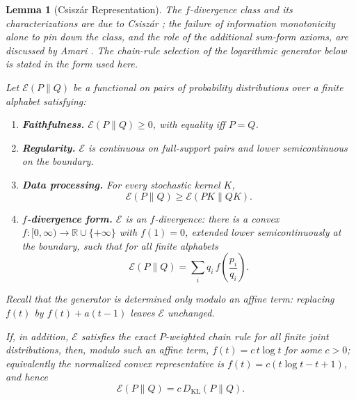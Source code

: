 \documentclass[12pt]{article}
\newtheorem{lemma}[theorem]{Lemma}
\theoremstyle{definition}
\begin{document}
\begin{lemma}[Csisz\'ar Representation]
\label{lem:csiszar-representation}
The $f$-divergence class and its characterizations are due to Csisz\'ar
\cite{csiszar1978}; the failure of information monotonicity alone to pin down
the class, and the role of the additional sum-form axioms, are discussed by
Amari \cite{amari2009}.  The chain-rule selection of the logarithmic generator
below is stated in the form used here.

Let $\mathcal E(P\|Q)$ be a functional on pairs of probability distributions
over a finite alphabet satisfying:
\begin{enumerate}[label=(\alph*)]
\item \textbf{Faithfulness.}
$\mathcal E(P\|Q)\ge0$, with equality iff $P=Q$.
\item \textbf{Regularity.}
$\mathcal E$ is continuous on full-support pairs and lower semicontinuous on
the boundary.
\item \textbf{Data processing.}
For every stochastic kernel $K$,
\[
\mathcal E(P\|Q)
\ge
\mathcal E(PK\|QK).
\]

\item \textbf{$f$-divergence form.}
$\mathcal E$ is an $f$-divergence: there is a convex
$f:[0,\infty)\to\mathbb R\cup\{+\infty\}$ with $f(1)=0$, extended lower
semicontinuously at the boundary, such that for all finite alphabets
\[
\mathcal E(P\|Q)
=
\sum_i q_i\,f\!\left(\frac{p_i}{q_i}\right).
\]
\end{enumerate}
Recall that the generator is determined only modulo an affine term: replacing
$f(t)$ by $f(t)+a(t-1)$ leaves $\mathcal E$ unchanged.

If, in addition, $\mathcal E$ satisfies the exact $P$-weighted chain rule for
all finite joint distributions, then, modulo such an affine term,
$f(t)=c\,t\log t$ for some $c>0$; equivalently the normalized convex
representative is $f(t)=c(t\log t-t+1)$, and hence
\[
\mathcal E(P\|Q)
=
c\,D_{\mathrm{KL}}(P\|Q).
\]
\end{lemma}
\end{document}
